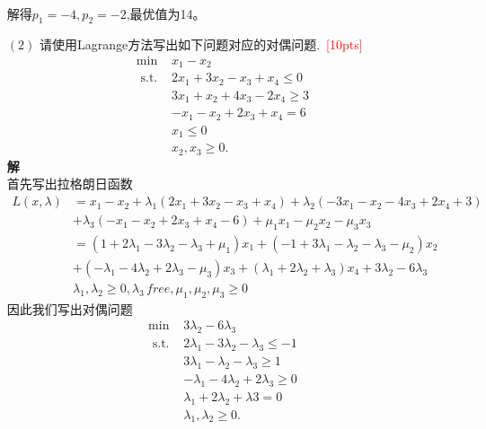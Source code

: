 \documentclass[10pt]{article}
\begin{document}
\begin{itemize}
\begin{figure}[h!]
	\end{figure}\\
	解得$p_1=-4,p_2=-2$,最优值为14。
	\item[$(2)$] 请使用Lagrange方法写出如下问题对应的对偶问题.~\textcolor{red}{[10pts]}
	\begin{equation}
		\begin{array}{ll}
			\min & x_{1} - x_{2} \\
			\text { s.t. } & 2 x_{1} + 3 x_{2} - x_{3} + x_{4} \leq 0 \\
			& 3 x_{1} + x_{2}  + 4 x_{3} - 2 x_{4} \geq 3 \\
			& -x_{1} - x_{2} + 2 x_{3} + x_{4} = 6\\
			& x_1 \leq 0\\
			& x_{2}, x_{3} \geq 0.
		\end{array}
	\end{equation}
	\textbf{解}\\
	首先写出拉格朗日函数
	\begin{align*}
		L(x,\lambda) &= x_1-x_2+\lambda_1(2x_1+3x_2-x_3+x_4)+\lambda_2(-3x_1-x_2-4x_3+2x_4+3)\\
		&+\lambda_3(-x_1-x_2+2x_3+x_4-6)+\mu_1x_1-\mu_2x_2-\mu_3x_3\\
		&=(1+2\lambda_1-3\lambda_2-\lambda_3+\mu_1)x_1+(-1+3\lambda_1-\lambda_2-\lambda_3-\mu_2)x_2\\
		&+(-\lambda_1-4\lambda_2+2\lambda_3-\mu_3)x_3+(\lambda_1+2\lambda_2+\lambda_3)x_4+3\lambda_2-6\lambda_3\\
		&\lambda_1,\lambda_2\ge 0,\lambda_3\, free, \mu_1,\mu_2,\mu_3\ge 0
	\end{align*}
	因此我们写出对偶问题
	\begin{equation}
		\begin{array}{ll}
			\min & 3\lambda_2 - 6\lambda_3 \\
			\text { s.t. } & 2\lambda_1-3\lambda_2-\lambda_3\le -1 \\
			& 3\lambda_1-\lambda_2-\lambda_3\ge 1\\
			& -\lambda_1-4\lambda_2+2\lambda_3\ge 0\\
			& \lambda_1+2\lambda_2+\lambda3= 0\\
			& \lambda_1,\lambda_2\ge 0.
		\end{array}
	\end{equation}
\end{itemize}
\end{document}
